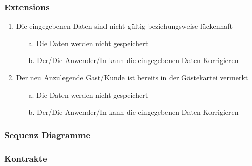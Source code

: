 \documentclass[./detailed_overview_usecases.tex]{subfiles}
\begin{document}
    \subsubsection*{Extensions}
    \begin{enumerate}
        \item Die eingegebenen Daten sind nicht gültig beziehungsweise lückenhaft
        \begin{itemize}
                       \item[a.] Die Daten werden nicht gespeichert
                       \item[b.] Der/Die Anwender/In kann die eingegebenen Daten Korrigieren
        \end{itemize}
        \item Der neu Anzulegende Gast/Kunde ist bereits in der Gästekartei vermerkt
        \begin{itemize}
            \item[a.] Die Daten werden nicht gespeichert
            \item[b.] Der/Die Anwender/In kann die eingegebenen Daten Korrigieren
        \end{itemize}
    \end{enumerate}

    \subsubsection{Sequenz Diagramme}
    \subsubsection{Kontrakte}
\end{document}
